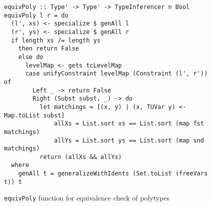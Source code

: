 \begin{figure}[H]
  \begin{verbatim}
equivPoly :: Type' -> Type' -> TypeInferencer n Bool
equivPoly l r = do
  (l', xs) <- specialize $ genAll l
  (r', ys) <- specialize $ genAll r
  if length xs /= length ys
    then return False
    else do
      levelMap <- gets tcLevelMap
      case unifyConstraint levelMap (Constraint (l', r')) of
        Left _ -> return False
        Right (Subst subst, _) -> do
          let matchings = [(x, y) | (x, TUVar y) <- Map.toList subst]
              allXs = List.sort xs == List.sort (map fst matchings)
              allYs = List.sort ys == List.sort (map snd matchings)
          return (allXs && allYs)
  where
    genAll t = generalizeWithIdents (Set.toList (freeVars t)) t
  \end{verbatim}
  \caption{\texttt{equivPoly} function for equivalence check of polytypes}
  \label{fig:equiv-poly-impl}
\end{figure}
